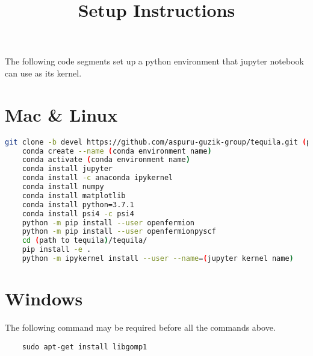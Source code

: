 \documentclass[12pt]{article}
\title{Setup Instructions}
\date{}
\begin{document}
\maketitle

The following code segments set up a python environment that jupyter notebook can use as its kernel. 

\section*{Mac \& Linux}

\begin{lstlisting}[language=bash]
    git clone -b devel https://github.com/aspuru-guzik-group/tequila.git (path to tequila)
    conda create --name (conda environment name)
    conda activate (conda environment name)
    conda install jupyter
    conda install -c anaconda ipykernel
    conda install numpy
    conda install matplotlib
    conda install python=3.7.1
    conda install psi4 -c psi4
    python -m pip install --user openfermion
    python -m pip install --user openfermionpyscf
    cd (path to tequila)/tequila/
    pip install -e .
    python -m ipykernel install --user --name=(jupyter kernel name)
\end{lstlisting}

\section*{Windows}
The following command may be required before all the commands above. 
\begin{lstlisting}
    sudo apt-get install libgomp1
\end{lstlisting}
\end{document}
